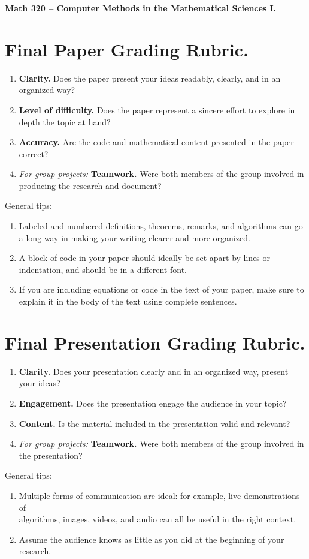 \documentclass[12pt]{article}
\begin{document}
{\bf \large Math 320 -- Computer Methods in the Mathematical Sciences I.}\\
\section{Final Paper Grading Rubric.}

\begin{enumerate}
\item {\bf Clarity.} Does the paper present your ideas readably, clearly,
and in an organized way?
\item {\bf Level of difficulty.} Does the paper represent a sincere
effort to explore in depth the topic at hand?
\item {\bf Accuracy.} Are the code and mathematical content presented
in the paper correct?
\item {\em For group projects:} {\bf Teamwork.} Were both members 
of the group involved in producing the research and document?

\end{enumerate}

General tips:

\begin{enumerate}
\item Labeled and numbered definitions, theorems, remarks, and algorithms 
can go a long way in making your writing clearer and more organized.
\item A block of code in your paper should ideally be set apart by
lines or indentation, and should be in a different font.
\item If you are including equations or code in the text of your paper,
make sure to explain it in the body of the text using complete sentences.
\end{enumerate}

\section{Final Presentation Grading Rubric.}

\begin{enumerate}
\item {\bf Clarity.} Does your presentation clearly and
in an organized way, present your ideas?
\item {\bf Engagement.} Does the presentation engage the audience
in your topic?
\item {\bf Content.} Is the material included in the presentation 
valid and relevant?
\item {\em For group projects:} {\bf Teamwork.} Were both members 
of the group involved in the presentation?
\end{enumerate}

General tips:

\begin{enumerate}
\item Multiple forms of communication are ideal: for example, live
demonstrations of \\ algorithms, images, videos, and audio can all be
useful in the right context.
\item Assume the audience knows as little as you did at the beginning
of your research.
\end{enumerate}
\end{document}
